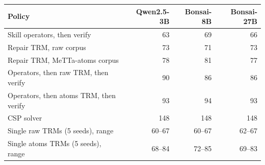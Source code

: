 \begin{tabular}{lrrr}
\toprule
Policy & Qwen2.5-3B & Bonsai-8B & Bonsai-27B \\
\midrule
Skill operators, then verify & 63 & 69 & 66 \\
Repair TRM, raw corpus & 73 & 71 & 73 \\
Repair TRM, MeTTa-atoms corpus & 78 & 81 & 77 \\
Operators, then raw TRM, then verify & 90 & 86 & 86 \\
Operators, then atoms TRM, then verify & 93 & 94 & 93 \\
CSP solver & 148 & 148 & 148 \\
\midrule
Single raw TRMs (5 seeds), range & 60--67 & 60--67 & 62--67 \\
Single atoms TRMs (5 seeds), range & 68--84 & 72--85 & 69--83 \\
\bottomrule
\end{tabular}
